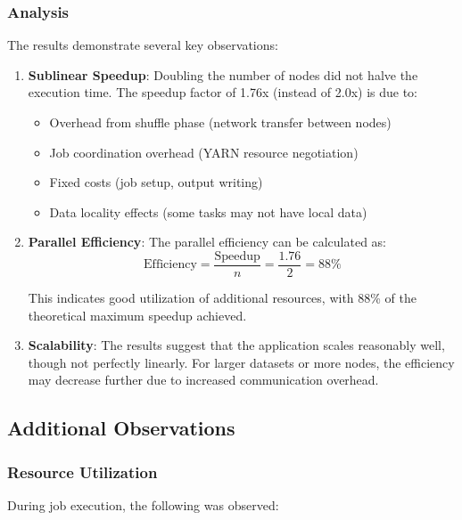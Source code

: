 \documentclass[11pt,a4paper]{article}
\begin{document}
\subsubsection{Analysis}

The results demonstrate several key observations:

\begin{enumerate}
    \item \textbf{Sublinear Speedup}: Doubling the number of nodes did not halve the execution time. The speedup factor of 1.76x (instead of 2.0x) is due to:
    \begin{itemize}
        \item Overhead from shuffle phase (network transfer between nodes)
        \item Job coordination overhead (YARN resource negotiation)
        \item Fixed costs (job setup, output writing)
        \item Data locality effects (some tasks may not have local data)
    \end{itemize}
    
    \item \textbf{Parallel Efficiency}: The parallel efficiency can be calculated as:
    \begin{equation}
    \text{Efficiency} = \frac{\text{Speedup}}{n} = \frac{1.76}{2} = 88\%
    \end{equation}
    
    This indicates good utilization of additional resources, with 88\% of the theoretical maximum speedup achieved.
    
    \item \textbf{Scalability}: The results suggest that the application scales reasonably well, though not perfectly linearly. For larger datasets or more nodes, the efficiency may decrease further due to increased communication overhead.
\end{enumerate}

\subsection{Additional Observations}

\subsubsection{Resource Utilization}

During job execution, the following was observed:
\end{document}
